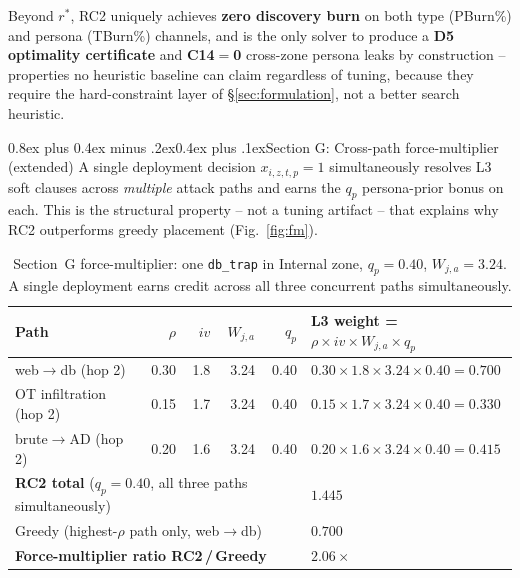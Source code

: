 \documentclass[10pt,twocolumn]{article}
\makeatletter
\renewcommand{\subsection}{\@startsection{subsection}{2}{0pt}%
  {0.8ex plus 0.4ex minus .2ex}{0.4ex plus .1ex}{\normalfont\bfseries}}
\makeatother
\begin{document}
Beyond $r^*$, RC2 uniquely achieves \textbf{zero discovery burn} on both type (PBurn\%) and persona (TBurn\%) channels, and is the only solver to produce a \textbf{D5 optimality certificate} and \textbf{C14$=$0} cross-zone persona leaks by construction -- properties no heuristic baseline can claim regardless of tuning, because they require the hard-constraint layer of \S\ref{sec:formulation}, not a better search heuristic.

\subsection{Section G: Cross-path force-multiplier (extended)}
A single deployment decision $x_{i,z,t,p}{=}1$ simultaneously resolves L3 soft clauses across \emph{multiple} attack paths and earns the $q_p$ persona-prior bonus on each. This is the structural property -- not a tuning artifact -- that explains why RC2 outperforms greedy placement (Fig.~\ref{fig:fm}).

\begin{table}[t]
\centering
\caption{Section~G force-multiplier: one \texttt{db\_trap} in Internal zone, $q_p{=}0.40$, $W_{j,a}{=}3.24$. A single deployment earns credit across all three concurrent paths simultaneously.}
\label{tab:fm}
\small
\setlength{\tabcolsep}{5pt}
\begin{tabular}{@{}lrrrrp{6.5cm}@{}}
\toprule
Path & $\rho$ & $iv$ & $W_{j,a}$ & $q_p$ & L3 weight = $\rho\times iv\times W_{j,a}\times q_p$ \\
\midrule
web$\to$db (hop 2)    & 0.30 & 1.8 & 3.24 & 0.40 & $0.30\times 1.8\times 3.24\times 0.40 = \mathbf{0.700}$ \\
OT infiltration (hop 2) & 0.15 & 1.7 & 3.24 & 0.40 & $0.15\times 1.7\times 3.24\times 0.40 = \mathbf{0.330}$ \\
brute$\to$AD (hop 2)  & 0.20 & 1.6 & 3.24 & 0.40 & $0.20\times 1.6\times 3.24\times 0.40 = \mathbf{0.415}$ \\
\midrule
\multicolumn{5}{l}{\textbf{RC2 total} ($q_p{=}0.40$, all three paths simultaneously)} & $\mathbf{1.445}$ \\
\multicolumn{5}{l}{Greedy (highest-$\rho$ path only, web$\to$db)}                     & $0.700$ \\
\multicolumn{5}{l}{\textbf{Force-multiplier ratio RC2\,/\,Greedy}}                    & $\mathbf{2.06\times}$ \\
\bottomrule
\end{tabular}
\end{table}
\end{document}
